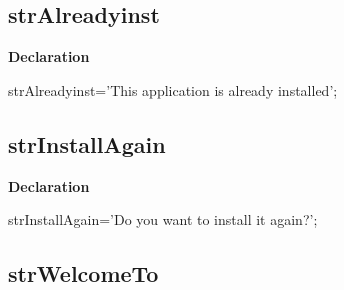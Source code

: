 \documentclass{report}
\newif\ifpdf
\begin{document}
\subsection*{strAlreadyinst}
\fi
\label{trstrings-strAlreadyinst}
\begin{list}{}{
\setlength{\itemindent}{0cm}
\setlength{\listparindent}{0cm}
\setlength{\leftmargin}{\evensidemargin}
\addtolength{\leftmargin}{\tmplength}
\settowidth{\labelsep}{X}
\addtolength{\leftmargin}{\labelsep}
\setlength{\labelwidth}{\tmplength}
}
\item[\textbf{Declaration}\hfill]
\ifpdf
\begin{flushleft}
\fi
\begin{ttfamily}
strAlreadyinst='This application is already installed';\end{ttfamily}

\ifpdf
\end{flushleft}
\fi

\end{list}
\ifpdf
\subsection*{\large{\textbf{strInstallAgain}}\normalsize\hspace{1ex}\hrulefill}
\else
\subsection*{strInstallAgain}
\fi
\label{trstrings-strInstallAgain}
\begin{list}{}{
\setlength{\itemindent}{0cm}
\setlength{\listparindent}{0cm}
\setlength{\leftmargin}{\evensidemargin}
\addtolength{\leftmargin}{\tmplength}
\settowidth{\labelsep}{X}
\addtolength{\leftmargin}{\labelsep}
\setlength{\labelwidth}{\tmplength}
}
\item[\textbf{Declaration}\hfill]
\ifpdf
\begin{flushleft}
\fi
\begin{ttfamily}
strInstallAgain='Do you want to install it again?';\end{ttfamily}

\ifpdf
\end{flushleft}
\fi

\end{list}
\ifpdf
\subsection*{\large{\textbf{strWelcomeTo}}\normalsize\hspace{1ex}\hrulefill}
\else
\end{document}
